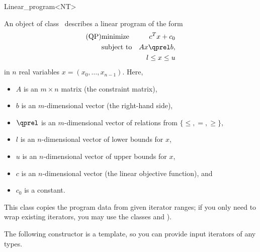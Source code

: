 \begin{ccRefClass}{Linear_program<NT>}


\ccDefinition
An object of class \ccRefName\ describes a linear program of the form
\begin{eqnarray*}
\mbox{(QP)}& \mbox{minimize} & c^{T}x+c_0 \\
&\mbox{subject to}   & Ax\qprel b, \\
&                    & l \leq x \leq u
\end{eqnarray*}
in $n$ real variables $x=(x_0,\ldots,x_{n-1})$.
Here, 
\begin{itemize}
\item $A$ is an $m\times n$ matrix (the constraint matrix), 
\item $b$ is an $m$-dimensional vector (the right-hand side),
\item $\qprel$ is an $m$-dimensional vector of relations 
from $\{\leq, =, \geq\}$, 
\item $l$ is an $n$-dimensional vector of lower
bounds for $x$,
\item $u$ is an $n$-dimensional vector of upper bounds for
$x$, 
\item $c$ is an $n$-dimensional vector (the linear objective
  function), and 
\item $c_0$ is a constant.
\end{itemize}

This class copies the program data from given iterator ranges; 
if you only need to wrap existing iterators, you may use the classes 
 and ).

\ccIsModel
{}

\ccCreation
\ccIndexClassCreation
{}

The following constructor is a template, so you can provide input
iterators of any types.


\ccSeeAlso
{}\\


\end{ccRefClass}
